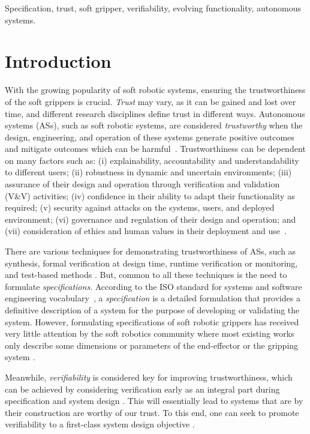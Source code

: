 \documentclass[lettersize,journal]{IEEEtran}
\begin{document}
\begin{IEEEkeywords}
	Specification, trust, soft gripper, verifiability, evolving functionality, autonomous systems.
\end{IEEEkeywords}

\section{Introduction}\label{introduction}
With the growing popularity of soft robotic systems, ensuring the trustworthiness of the soft grippers is crucial. 
\emph{Trust} may vary, as it can be gained and lost over time, and different research disciplines define trust in different ways. 
Autonomous systems (ASs), such as soft robotic systems, are considered \emph{trustworthy} when the design, engineering, and operation of these systems generate positive outcomes and mitigate outcomes which can be harmful~\cite{Naiseh2022}.
Trustworthiness can be dependent on many factors such as: (i) explainability, accountability and understandability to different users; (ii) robustness in dynamic and uncertain environments; (iii) assurance of their design and operation through verification and validation (V\&V) activities; (iv) confidence in their ability to adapt their functionality as required; (v) security against attacks on the systems, users, and deployed environment; (vi) governance and regulation of their design and operation; and (vii) consideration of ethics and human values in their deployment and use~\cite{Naiseh2022}. 

There are various techniques for demonstrating trustworthiness of ASs, such as synthesis, formal verification at design time, runtime verification or monitoring, and test-based methods \cite{Abeywickrama2022}. 
But, common to all these techniques is the need to formulate \emph{specifications}. 	
According to the ISO standard for systems and software engineering vocabulary~\cite{ISO24765:2017}, a \emph{specification} is a detailed formulation that provides a definitive description of a system for the purpose of developing or validating the system. 
However, formulating specifications of soft robotic grippers has received very little attention by the soft robotics community where most existing works only describe some dimensions or parameters of the end-effector or the gripping system \cite{Hong2022,Bhattacharya2019,Tadakuma2020,Loh2014,Nishikawa2019,Mohan2020}.  

Meanwhile, \emph{verifiability} is considered key for improving trustworthiness, which can be achieved by considering verification early as an integral part during specification and system design \cite{Mousavi2022}. This will essentially lead to systems that are by their construction are worthy of our trust. To this end, one can seek to promote verifiability to a first-class system design objective \cite{Eder2021}. 
\end{document}
